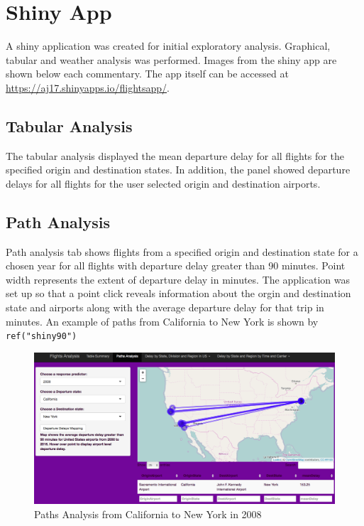 \documentclass[12pt,twoside]{amherstthesis}
\begin{document}
  \section{Shiny App}\label{shiny-app}
  
  A shiny application was created for initial exploratory analysis.
  Graphical, tabular and weather analysis was performed. Images from the
  shiny app are shown below each commentary. The app itself can be
  accessed at \url{https://aj17.shinyapps.io/flightsapp/}.
  
  \subsection{Tabular Analysis}\label{tabular-analysis}
  
  The tabular analysis displayed the mean departure delay for all flights
  for the specified origin and destination states. In addition, the panel
  showed departure delays for all flights for the user selected origin and
  destination airports.
  
  \subsection{Path Analysis}\label{path-analysis}
  
  Path analysis tab shows flights from a specified origin and destination
  state for a chosen year for all flights with departure delay greater
  than 90 minutes. Point width represents the extent of departure delay in
  minutes. The application was set up so that a point click reveals
  information about the orgin and destination state and airports along
  with the average departure delay for that trip in minutes. An example of
  paths from California to New York is shown by \texttt{ref("shiny90")}
  
  \begin{figure}[htbp]
  \centering
  \includegraphics[scale = 0.35,angle = 0]{figure/PathsAnalysis2.png}
  \caption[Paths Analysis from California to New York in 2008]{\normalsize{Paths Analysis from California to New York in 2008}}
  \label{fig:shiny90}
  \end{figure}
  
\end{document}
